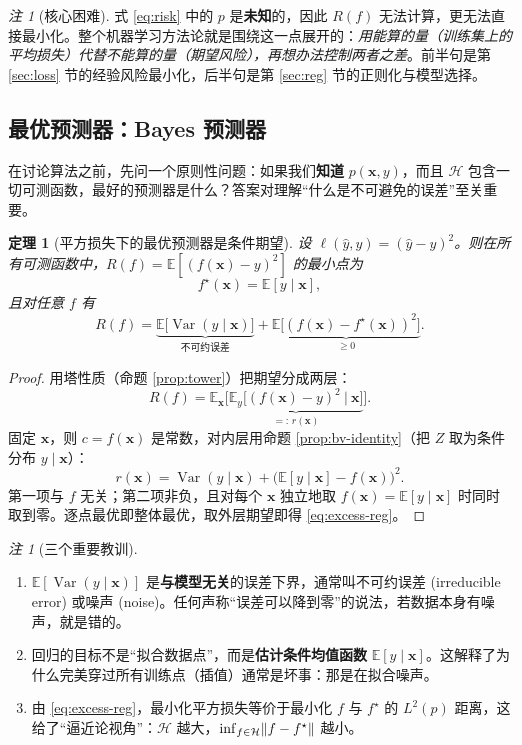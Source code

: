 \documentclass[UTF8,a4paper,11pt]{ctexart}
\theoremstyle{definition}
\theoremstyle{plain}
\newtheorem{theorem}[definition]{定理}
\theoremstyle{remark}
\newtheorem{remark}[definition]{注}
\DeclarePairedDelimiter{\norm}{\lVert}{\rVert}
\DeclareMathOperator{\Var}{Var}
\newcommand{\E}{\mathbb{E}}
\newcommand{\Hyp}{\mathcal{H}}
\newcommand{\eng}[1]{\textup{(#1)}}
\begin{document}
\begin{remark}[核心困难]
式 \eqref{eq:risk} 中的 $p$ 是\textbf{未知}的，因此 $R(f)$ 无法计算，更无法直接最小化。整个机器学习方法论就是围绕这一点展开的：\emph{用能算的量（训练集上的平均损失）代替不能算的量（期望风险），再想办法控制两者之差}。前半句是第 \ref{sec:loss} 节的经验风险最小化，后半句是第 \ref{sec:reg} 节的正则化与模型选择。
\end{remark}

\subsection{最优预测器：Bayes 预测器}

在讨论算法之前，先问一个原则性问题：如果我们\textbf{知道} $p(\bm{x},y)$，而且 $\Hyp$ 包含一切可测函数，最好的预测器是什么？答案对理解“什么是不可避免的误差”至关重要。

\begin{theorem}[平方损失下的最优预测器是条件期望]\label{thm:bayes-reg}
设 $\ell(\hat y,y)=(\hat y-y)^2$。则在所有可测函数中，$R(f)=\E[(f(\bm{x})-y)^2]$ 的最小点为
\[
  f^\star(\bm{x})=\E[y\mid\bm{x}],
\]
且对任意 $f$ 有
\begin{equation}\label{eq:excess-reg}
  R(f)=\underbrace{\E\big[\Var(y\mid\bm{x})\big]}_{\text{不可约误差}}+\underbrace{\E\big[(f(\bm{x})-f^\star(\bm{x}))^2\big]}_{\ge0}.
\end{equation}
\end{theorem}

\begin{proof}
用塔性质（命题 \ref{prop:tower}）把期望分成两层：
\[
  R(f)=\E_{\bm{x}}\Big[\underbrace{\E_{y}\big[(f(\bm{x})-y)^2\ \big|\ \bm{x}\big]}_{=:\,r(\bm{x})}\Big].
\]
固定 $\bm{x}$，则 $c=f(\bm{x})$ 是常数，对内层用命题 \ref{prop:bv-identity}（把 $Z$ 取为条件分布 $y\mid\bm{x}$）：
\[
  r(\bm{x})=\Var(y\mid\bm{x})+\big(\E[y\mid\bm{x}]-f(\bm{x})\big)^2 .
\]
第一项与 $f$ 无关；第二项非负，且对每个 $\bm{x}$ 独立地取 $f(\bm{x})=\E[y\mid\bm{x}]$ 时同时取到零。逐点最优即整体最优，取外层期望即得 \eqref{eq:excess-reg}。
\end{proof}

\begin{remark}[三个重要教训]
\begin{enumerate}[label=(\arabic*)]
  \item $\E[\Var(y\mid\bm{x})]$ 是\textbf{与模型无关}的误差下界，通常叫不可约误差 \eng{irreducible error} 或噪声 \eng{noise}。任何声称“误差可以降到零”的说法，若数据本身有噪声，就是错的。
  \item 回归的目标不是“拟合数据点”，而是\textbf{估计条件均值函数} $\E[y\mid\bm{x}]$。这解释了为什么完美穿过所有训练点（插值）通常是坏事：那是在拟合噪声。
  \item 由 \eqref{eq:excess-reg}，最小化平方损失等价于最小化 $f$ 与 $f^\star$ 的 $L^2(p)$ 距离，这给了“逼近论视角”：$\Hyp$ 越大，$\inf_{f\in\Hyp}\norm{f-f^\star}$ 越小。
\end{enumerate}
\end{remark}
\end{document}
